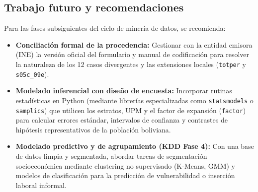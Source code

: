 \subsection{Trabajo futuro y recomendaciones}
Para las fases subsiguientes del ciclo de minería de datos, se recomienda:
\begin{itemize}[leftmargin=0.5in]
  \item \textbf{Conciliación formal de la procedencia:} Gestionar con la entidad emisora (INE) la versión oficial del formulario y manual de codificación para resolver la naturaleza de los 12 casos divergentes y las extensiones locales (\texttt{totper} y \texttt{s05c\_09e}).
  \item \textbf{Modelado inferencial con diseño de encuesta:} Incorporar rutinas estadísticas en Python (mediante librerías especializadas como \texttt{statsmodels} o \texttt{samplics}) que utilicen los estratos, UPM y el factor de expansión (\texttt{factor}) para calcular errores estándar, intervalos de confianza y contrastes de hipótesis representativos de la población boliviana.
  \item \textbf{Modelado predictivo y de agrupamiento (KDD Fase 4):} Con una base de datos limpia y segmentada, abordar tareas de segmentación socioeconómica mediante clustering no supervisado (K-Means, GMM) y modelos de clasificación para la predicción de vulnerabilidad o inserción laboral informal.
\end{itemize}
